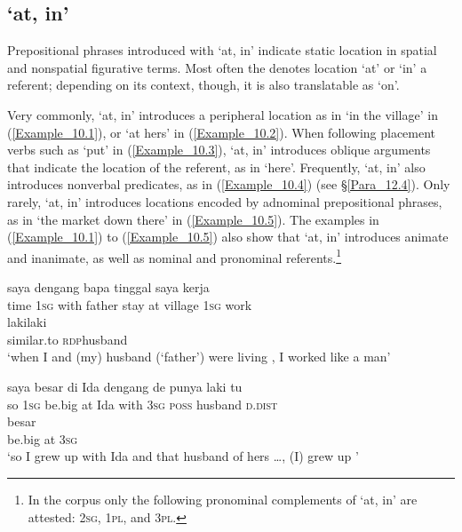 \subsection{ ‘at, in’}
\label{Para_10.1.1}
Prepositional phrases introduced with   ‘at, in’ indicate static location in spatial and nonspatial figurative terms. Most often the  denotes location ‘at’ or ‘in’ a referent; depending on its context, though, it is also translatable as ‘on’.

Very commonly,  ‘at, in’ introduces a peripheral location as in  ‘in the village’ in (\ref{Example_10.1}), or  ‘at hers’ in (\ref{Example_10.2}). When following placement verbs such as  ‘put’ in (\ref{Example_10.3}),  ‘at, in’ introduces oblique  arguments that indicate the location of the referent, as in  ‘here’. Frequently,  ‘at, in’ also introduces nonverbal predicates, as in (\ref{Example_10.4}) (see §\ref{Para_12.4}). Only rarely,  ‘at, in’ introduces locations encoded by adnominal prepositional phrases, as in  ‘the market down there’ in (\ref{Example_10.5}). The examples in (\ref{Example_10.1}) to (\ref{Example_10.5}) also show that  ‘at, in’ introduces animate and inanimate, as well as nominal and pronominal referents.\footnote{In the corpus only the following pronominal complements of  ‘at, in’ are attested: \textsc{2sg}, \textsc{1pl}, and \textsc{3pl}.}


\ea
\label{Example_10.1}
 {{saya}} {dengang} {bapa} {tinggal} {} {} {saya} {kerja}\\ %
 time  {\textsc{1sg}}  with  father  stay  at  village  \textsc{1sg}  work\\
  {laki{\Tilde}laki}\\
 {similar.to}  {\textsc{rdp}{\Tilde}husband}\\
\glt 
‘when I and (my) husband (‘father’) were living , I worked like a man’ \textstyleExampleSource{[081014-007-CvEx.0048]}
\z

\ea
\label{Example_10.2}
 {{saya}} {{besar}} {di} {Ida} {dengang} {de} {punya} {laki} {tu}\\ %
 {so}  {\textsc{1sg}}  {be.big}  at  Ida  with  \textsc{3sg}  \textsc{poss}  husband  \textsc{d.dist}\\
\gll {\ldots}  {besar}  {}  {}\\
  { } {be.big}  {at}  {\textsc{3sg}}\\
\glt 
‘so I grew up with Ida and that husband of hers {\ldots}, (I) grew up ’ \textstyleExampleSource{[080927-007-CvNP.0017/0019]}
\z

